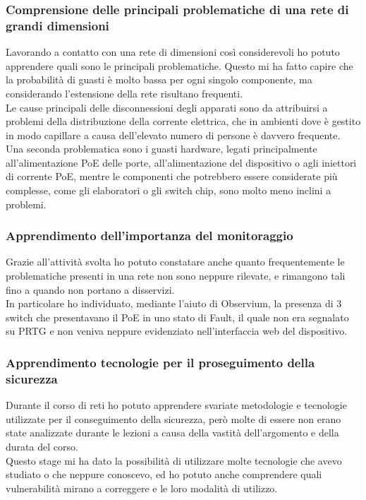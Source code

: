 \documentclass[Tesi.tex]{subfiles}
\begin{document}
\subsubsection{Comprensione delle principali problematiche di una rete di grandi dimensioni}
Lavorando a contatto con una rete di dimensioni così considerevoli ho potuto apprendere quali sono le principali problematiche. Questo mi ha fatto capire che la probabilità di guasti è molto bassa per ogni singolo componente, ma considerando l'estensione della rete risultano frequenti. \\
Le cause principali delle disconnessioni degli apparati sono da attribuirsi a problemi della distribuzione della corrente elettrica, che in ambienti dove è gestito in modo capillare a causa dell'elevato numero di persone è davvero frequente. \\
Una seconda problematica sono i guasti hardware, legati principalmente all'alimentazione PoE delle porte, all'alimentazione del dispositivo o agli iniettori di corrente PoE, mentre le componenti che potrebbero essere considerate più complesse, come gli elaboratori o gli switch chip, sono molto meno inclini a problemi.

\subsubsection{Apprendimento dell'importanza del monitoraggio}
Grazie all'attività svolta ho potuto constatare anche quanto frequentemente le problematiche presenti in una rete non sono neppure rilevate, e rimangono tali fino a quando non portano a disservizi. \\
In particolare ho individuato, mediante l'aiuto di Observium, la presenza di 3 switch che presentavano il PoE in uno stato di Fault, il quale non era segnalato su PRTG e non veniva neppure evidenziato nell'interfaccia web del dispositivo.

\subsubsection{Apprendimento tecnologie per il proseguimento della sicurezza}
Durante il corso di reti ho potuto apprendere svariate metodologie e tecnologie utilizzate per il conseguimento della sicurezza, però molte di essere non erano state analizzate durante le lezioni a causa della vastità dell'argomento e della durata del corso. \\
Questo stage mi ha dato la possibilità di utilizzare molte tecnologie che avevo studiato o che neppure conoscevo, ed ho potuto anche comprendere quali vulnerabilità mirano a correggere e le loro modalità di utilizzo.
\end{document}
